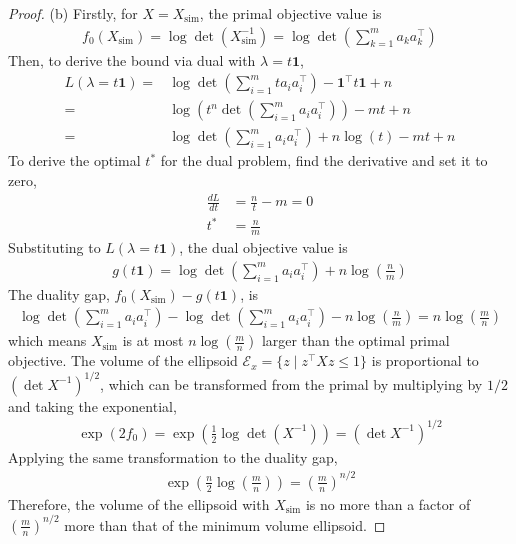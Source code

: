 \documentclass[11pt]{article}
\begin{document}
\begin{proof}
  (b)
  Firstly, for $X = X_\text{sim}$, the primal objective value is 
  \begin{align*}
      f_0(X_\text{sim}) = \log \det(X_\text{sim}^{-1}) = \log \det \left( \sum_{k=1}^m a_k a_k^\top \right)
  \end{align*}
  Then, to derive the bound via dual with $\lambda = t\mathbf{1}$, 
  \begin{align*}
      L(\lambda = t\textbf{1}) =& \log \det \left( \sum_{i=1}^m t a_i a_i^\top \right) - \mathbf{1}^\top t \textbf{1} + n \\
      =& \log \left( t^n \det \left( \sum_{i=1}^m a_i a_i^\top \right) \right) - mt + n \\
      =& \log \det \left( \sum_{i=1}^m a_i a_i^\top \right) + n\log(t) - mt + n
  \end{align*}
  To derive the optimal $t^*$ for the dual problem, find the derivative and set it to zero, 
  \begin{align*}
      \frac{dL}{dt} &= \frac{n}{t} - m = 0 \\
      t^* &= \frac{n}{m}
  \end{align*}
  Substituting to $L(\lambda = t\textbf{1})$, the dual objective value is  
  \begin{align*}
      g(t\mathbf{1}) = \log \det \left( \sum_{i=1}^m a_i a_i^\top \right) + n\log\left(\frac{n}{m}\right)
  \end{align*}
  The duality gap, $f_0(X_\text{sim}) - g(t\mathbf{1})$, is 
  \begin{align*}
    \log \det \left( \sum_{i=1}^m a_i a_i^\top \right) - \log \det \left( \sum_{i=1}^m a_i a_i^\top \right) - n\log\left(\frac{n}{m}\right) = n\log\left(\frac{m}{n}\right)
  \end{align*}
  which means $X_\text{sim}$ is at most $n\log\left(\frac{m}{n}\right)$ larger than the optimal primal objective. The volume of the ellipsoid $\mathcal{E}_x = \{z \mid z^\top X z \leq 1\}$ is proportional to $(\det X^{-1})^{1/2}$, which can be transformed from the primal by multiplying by $1/2$ and taking the exponential, 
  \begin{align*}
      \exp(2 f_0) = \exp\left(\frac{1}{2}\log \det(X^{-1})\right) = (\det X^{-1})^{1/2}
  \end{align*}
  Applying the same transformation to the duality gap, 
  \begin{align*}
      \exp\left( \frac{n}{2} \log\left(\frac{m}{n}\right) \right) = \left(\frac{m}{n}\right)^{n/2}
  \end{align*}
  Therefore, the volume of the ellipsoid with $X_\text{sim}$ is no more than a factor of $\left(\frac{m}{n}\right)^{n/2}$ more than that of the minimum volume ellipsoid. 

\end{proof}
\end{document}

